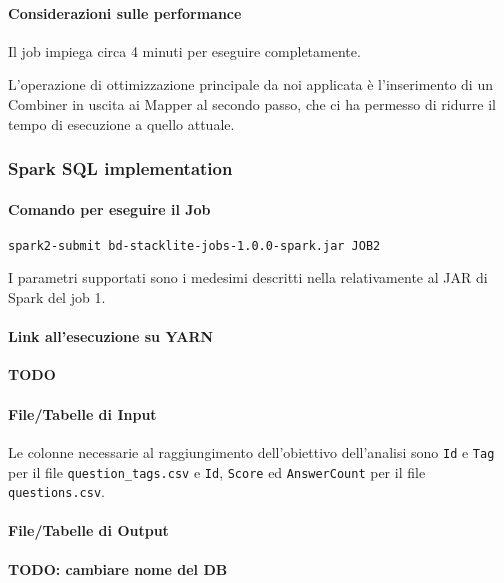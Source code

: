   \paragraph{Considerazioni sulle performance}\label{par:job2:mapreduce:performance}

  Il job impiega circa 4 minuti per eseguire completamente.

  L'operazione di ottimizzazione principale da noi applicata è l'inserimento di un Combiner in uscita ai Mapper al secondo passo,
  che ci ha permesso di ridurre il tempo di esecuzione a quello attuale.

  \subsubsection{Spark SQL implementation}\label{subsub:job2:spark}

  \paragraph{Comando per eseguire il Job}\label{par:job2:spark:cmd}

  \texttt{spark2-submit bd-stacklite-jobs-1.0.0-spark.jar JOB2}

  I parametri supportati sono i medesimi descritti nella  relativamente al JAR di Spark del job 1.

  \paragraph{Link all'esecuzione su YARN}\label{par:job2:spark:yarn}

  \textbf{TODO}

  \paragraph{File/Tabelle di Input}\label{par:job2:spark:input}

  Le colonne necessarie al raggiungimento dell'obiettivo dell'analisi sono \texttt{Id} e \texttt{Tag} per il file \texttt{question\_tags.csv}
  e \texttt{Id}, \texttt{Score} ed \texttt{AnswerCount} per il file \texttt{questions.csv}.

  \paragraph{File/Tabelle di Output}\label{par:job2:spark:output}

  \textbf{TODO: cambiare nome del DB}

